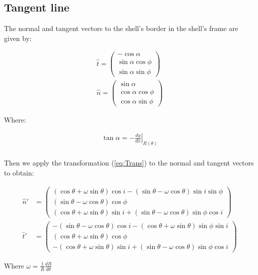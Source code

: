\subsection{Tangent line}

The normal and tangent vectors to the shell's border in the shell's frame are given by:

\begin{align}
\hat{t} = \left(\begin{array}{c}
-\cos\alpha \\
\sin\alpha\cos\phi\\
\sin\alpha\sin\phi
\end{array}\right)\\
\hat{n} = \left(\begin{array}{c}
\sin\alpha \\
\cos\alpha\cos\phi \\
\cos\alpha\sin\phi
\end{array}\right)
\end{align}

Where:

\begin{align}
\tan\alpha = -\left.\frac{dy}{dx}\right|_{R(\theta)} \\
\label{eq:tanalpha}
\end{align}

Then we apply the transformation (\ref{eq:Trans}) to the normal and tangent vectors to obtain:

\begin{align}
\hat{n}' &= \left(\begin{array}{c}
(\cos\theta+\omega\sin\theta)\cos i -(\sin\theta-\omega\cos\theta)\sin i \sin\phi\\
(\sin\theta-\omega\cos\theta)\cos\phi \\
(\cos\theta+\omega\sin\theta)\sin i + (\sin\theta-\omega\cos\theta)\sin\phi\cos i
\end{array}\right)\\
\hat{t}' &= \left(\begin{array}{c}
-(\sin\theta-\omega\cos\theta)\cos i - (\cos\theta+\omega\sin\theta)\sin\phi\sin i \\
(\cos\theta+\omega\sin\theta)\cos\phi \\
-(\cos\theta+\omega\sin\theta)\sin i + (\sin\theta-\omega\cos\theta)\sin\phi\cos i
\end{array}\right)
\end{align}

Where $\omega = \frac{1}{R}\frac{dR}{d\theta}$

